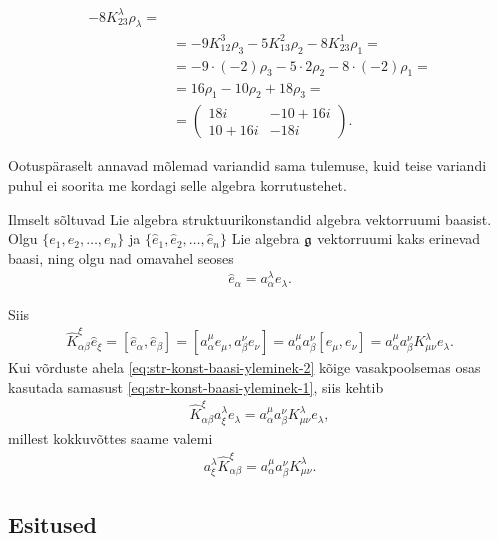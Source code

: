 \begin{naide}
\begin{align*}
           -8 K_{23}^{\lambda} \rho_\lambda = \\
        &= -9 K_{12}^{3} \rho_3
           -5 K_{13}^{2} \rho_2
           -8 K_{23}^{1} \rho_1 = \\
        &= -9 \cdot (-2) \rho_3
           -5 \cdot 2 \rho_2
           -8 \cdot (-2) \rho_1 = \\
        &= 16 \rho_1 - 10 \rho_2 + 18 \rho_3 = \\[0.1cm]
        &= \begin{pmatrix}
               18i & -10+16i \\
            10+16i &    -18i
        \end{pmatrix}.
    \end{align*}

    Ootuspäraselt annavad mõlemad variandid sama tulemuse, kuid teise
    variandi puhul ei soorita me kordagi selle algebra korrutustehet.
\end{naide}

Ilmselt sõltuvad Lie algebra struktuurikonstandid algebra vektorruumi
baasist. Olgu $\{ e_1, e_2, \dots, e_n \}$ ja
$\{ \hat{e}_1, \hat{e}_2, \dots, \hat{e}_n \}$ Lie algebra $\mathfrak{g}$
vektorruumi kaks erinevad baasi, ning olgu nad omavahel seoses
\begin{align}\label{eq:str-konst-baasi-yleminek-1}
    \hat{e}_\alpha = a_\alpha^\lambda e_\lambda.
\end{align}

Siis
\begin{align}\label{eq:str-konst-baasi-yleminek-2}
    \hat{K}_{\alpha \beta}^{\xi} \hat{e}_\xi = 
    [\hat{e}_\alpha, \hat{e}_\beta] =
    [a_\alpha^\mu e_\mu, a_\beta^\nu e_\nu] =
    a_\alpha^\mu a_\beta^\nu [e_\mu, e_\nu] =
    a_\alpha^\mu a_\beta^\nu K_{\mu \nu}^{\lambda} e_\lambda.
\end{align}
Kui võrduste ahela \eqref{eq:str-konst-baasi-yleminek-2} kõige
vasakpoolsemas osas kasutada samasust
\eqref{eq:str-konst-baasi-yleminek-1}, siis kehtib
\begin{align*}
    \hat{K}_{\alpha \beta}^{\xi} a_\xi^\lambda e_\lambda =
    a_\alpha^\mu a_\beta^\nu K_{\mu \nu}^{\lambda} e_\lambda,
\end{align*}
millest kokkuvõttes saame valemi
\begin{align*}
    a_\xi^\lambda \hat{K}_{\alpha \beta}^{\xi} =
    a_\alpha^\mu a_\beta^\nu K_{\mu \nu}^{\lambda}.
\end{align*}

\subsection{Esitused}


